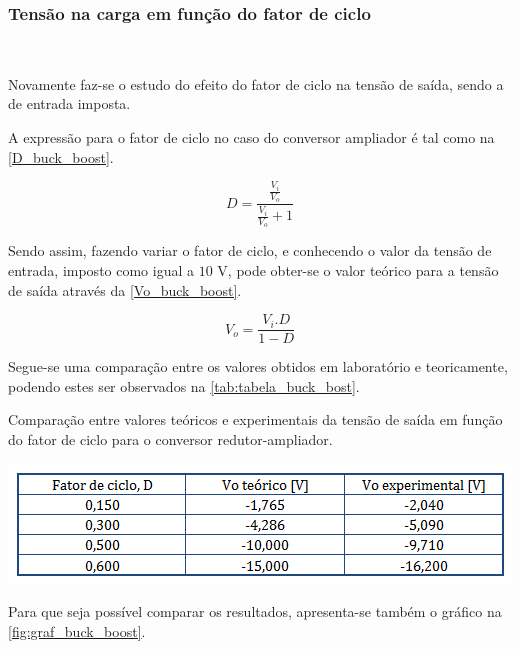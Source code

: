 \documentclass[a4paper,11pt]{article}
\numberwithin{equation}{section}
\begin{document}
\subsubsection{Tensão na carga em função do fator de ciclo}\mbox{}\

Novamente faz-se o estudo do efeito do fator de ciclo na tensão de saída, sendo a de entrada imposta.

A expressão para o fator de ciclo no caso do conversor ampliador é tal como na \autoref{D_buck_boost}.

\begin{equation}
D = \frac{\frac{V_i}{V_o}}{\frac{V_i}{V_o} + 1} \label{D_buck_boost}
\end{equation}

Sendo assim, fazendo variar o fator de ciclo, e conhecendo o valor da tensão de entrada, imposto como igual a $10$ V, pode obter-se o valor teórico para a tensão de saída através da \autoref{Vo_buck_boost}.

\begin{equation}
V_o = \frac{V_i.D}{1-D} \label{Vo_buck_boost}
\end{equation}

Segue-se uma comparação entre os valores obtidos em laboratório e teoricamente, podendo estes ser observados na \autoref{tab:tabela_buck_bost}.

\begin{table}[!htb]
	\centering
	\caption{Comparação entre valores teóricos e experimentais da tensão de saída em função do fator de ciclo para o conversor redutor-ampliador.}
	\includegraphics[width=0.8\linewidth]{teoricas/tabela_buck_boost}
	\label{tab:tabela_buck_bost}
\end{table}

Para que seja possível comparar os resultados, apresenta-se também o gráfico na \autoref{fig:graf_buck_boost}.
\end{document}
